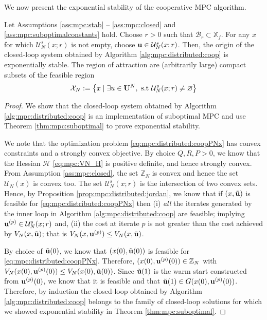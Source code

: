 We now present the exponential stability of the cooperative MPC algorithm.
\begin{theorem}
Let Assumptions \ref{ass:mpc:stab} -- \ref{ass:mpc:closed} and
\ref{ass:mpc:suboptimalconstants} 
hold. Choose $r>0$ such that $\mathcal{B}_r \subset \mathbb{X}_f$. For
any $x$ for which  $\mathcal{U}_N^s(x;r)$  is not empty, choose 
$\mathbf{u} \in \mathcal{U}_N^s(x;r)$. Then, the origin of the closed-loop system 
obtained by Algorithm \ref{alg:mpc:distributed:coop}
is exponentially stable. The region of attraction are (arbitrarily large) compact  subsets of
the feasible region \[\mathcal{X}_N :=\left\lbrace x\mid \exists u \in
 \mathbf{U}^N, \text{~s.t~} \mathcal{U}^s_N(x;r) \neq \varnothing \right\rbrace\]
\begin{proof}
We show that the closed-loop system obtained by Algorithm
\ref{alg:mpc:distributed:coop} is an implementation of suboptimal MPC
and use Theorem \ref{thm:mpc:suboptimal} to prove exponential stability. 



We note that the optimization problem \eqref{eq:mpc:distributed:coopPNx} 
has convex constraints and a strongly convex objective. By choice
$Q,R,P>0$, we know that the Hessian $\mathcal{H}$
\eqref{eq:mpc:VN_H} is positive definite, and hence strongly
convex. From Assumption \ref{ass:mpc:closed}, the set $\mathbb{Z}_N$ is
convex and hence the set $\mathcal{U}_N(x)$ is convex too. The set
$\mathcal{U}_N^{s}(x;r)$ is the intersection of two convex
sets. Hence, by Proposition \ref{prop:mpc:distributed:jordan}, we know
that  if $(x,\tilde{\mathbf{u}})$ is feasible for
\eqref{eq:mpc:distributed:coopPNx} then (i) {\emph{all}} the iterates generated by the inner loop in  Algorithm
\ref{alg:mpc:distributed:coop} are feasible; implying $\mathbf{u}^{(p)} \in
\mathcal{U}_N^{s}(x;r)$ and, (ii) the cost at iterate $p$ is not
greater than the cost achieved by $V_N(x,\tilde{\mathbf{u}})$; that is
$V_N(x,\mathbf{u}^{(p)}) \leq V_N(x,\tilde{\mathbf{u}})$. 

By choice of $\tilde{\mathbf{u}}(0)$, we know that $(x(0),\tilde{\mathbf{u}}(0))$ is
feasible for \eqref{eq:mpc:distributed:coopPNx}. Therefore,
$(x(0),\mathbf{u}^{(p)}(0)) \in \mathbb{Z}_N$ with $V_N(x(0),\mathbf{u}^{(p)}(0))
\leq V_N(x(0), \tilde{\mathbf{u}}(0))$. Since $\tilde{\mathbf{u}}(1)$ is the warm
start constructed from $\mathbf{u}^{(p)}(0)$, we know that it is feasible and
that $\tilde{\mathbf{u}}(1) \in G(x(0),\mathbf{u}^{(p)}(0))$. Therefore, by induction
the closed-loop obtained by
Algorithm \ref{alg:mpc:distributed:coop} belongs to the family of
closed-loop solutions for which we showed exponential stability in
Theorem \ref{thm:mpc:suboptimal}.
\end{proof}
\end{theorem}

